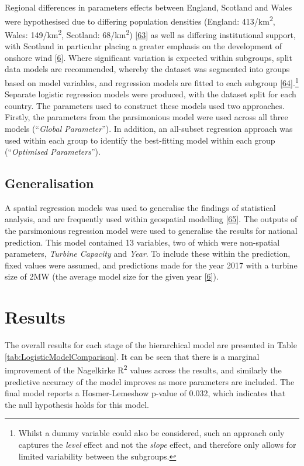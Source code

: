 \documentclass[a4paper,]{article}
\let\rmarkdownfootnote\footnote%
\def\footnote{\protect\rmarkdownfootnote}
\theoremstyle{definition}
\theoremstyle{definition}
\theoremstyle{definition}
\theoremstyle{remark}
\begin{document}
Regional differences in parameters effects between England, Scotland and
Wales were hypothesised due to differing population densities (England:
413/km\textsuperscript{2}, Wales: 149/km\textsuperscript{2}, Scotland:
68/km\textsuperscript{2}) {[}\protect\hyperlink{ref-ONS2013}{63}{]} as
well as differing institutional support, with Scotland in particular
placing a greater emphasis on the development of onshore wind
{[}\protect\hyperlink{ref-DECC2016}{6}{]}. Where significant variation
is expected within subgroups, split data models are recommended, whereby
the dataset was segmented into groups based on model variables, and
regression models are fitted to each subgroup
{[}\protect\hyperlink{ref-Stoltzfus2011}{64}{]}.\footnote{Whilst a dummy
  variable could also be considered, such an approach only captures the
  \emph{level} effect and not the \emph{slope} effect, and therefore
  only allows for limited variability between the subgroups.} Separate
logistic regression models were produced, with the dataset split for
each country. The parameters used to construct these models used two
approaches. Firstly, the parameters from the parsimonious model were
used across all three models (``\emph{Global Parameter}''). In addition,
an all-subset regression approach was used within each group to identify
the best-fitting model within each group (``\emph{Optimised
Parameters}'').

\subsection{Generalisation}\label{generalisation}

A spatial regression models was used to generalise the findings of
statistical analysis, and are frequently used within geospatial
modelling {[}\protect\hyperlink{ref-Ward2008}{65}{]}. The outputs of the
parsimonious regression model were used to generalise the results for
national prediction. This model contained 13 variables, two of which
were non-spatial parameters, \emph{Turbine Capacity} and \emph{Year}. To
include these within the prediction, fixed values were assumed, and
predictions made for the year 2017 with a turbine size of 2MW (the
average model size for the given year
{[}\protect\hyperlink{ref-DECC2016}{6}{]}).

\section{Results}\label{results}

The overall results for each stage of the hierarchical model are
presented in Table \ref{tab:LogisticModelComparison}. It can be seen
that there is a marginal improvement of the Nagelkirke
R\textsuperscript{2} values across the results, and similarly the
predictive accuracy of the model improves as more parameters are
included. The final model reports a Hosmer-Lemeshow p-value of 0.032,
which indicates that the null hypothesis holds for this model.
\end{document}
